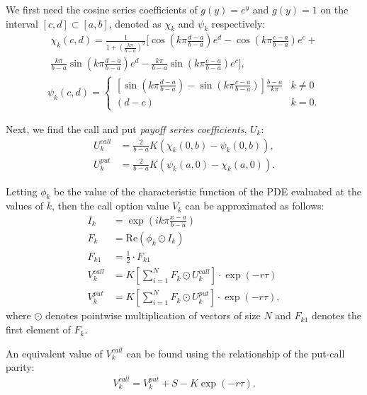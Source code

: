 \documentclass[12pt,a4paper]{article}
\begin{document}
We first need the cosine series coefficients of $g(y)=e^y$ and $g(y)=1$ on the interval $[c, d] \subset [a, b]$, denoted as $\chi_k$ and $\psi_k$ respectively:
\begin{align}
    \nonumber
    \chi_k(c, d) = \frac{1}{1+\left(\frac{k\pi}{b-a}\right)^2} \Biggl[ \cos\left(k\pi\frac{d-a}{b-a}\right)e^d - \cos\left(k\pi\frac{c-a}{b-a}\right)e^c + 
\\
\frac{k\pi}{b-a}\sin\left(k\pi\frac{d-a}{b-a}\right)e^d -  \frac{k\pi}{b-a}\sin\left(k\pi\frac{c-a}{b-a}\right)e^c \Biggr],
\end{align}
\begin{align}
\psi_k(c, d) = \begin{cases}
      \left[\sin\left(k\pi\frac{d-a}{b-a}\right) - \sin\left(k\pi\frac{c-a}{b-a}\right)\right]\frac{b-a}{k\pi} & k \neq 0\\
      (d-c) & k=0.
    \end{cases} 
\end{align}

Next, we find the call and put \textit{payoff series coefficients}, $U_k$:
\begin{align}
    U_k^{call} &= \frac{2}{b-a}K(\chi_k(0,b)-\psi_k(0,b)),\\
    U_k^{put} &= \frac{2}{b-a}K(\psi_k(a,0)-\chi_k(a,0)).
\end{align}

Letting $\phi_k$ be the value of the characteristic function of the PDE evaluated at the values of $k$, then the call option value $V_k$ can be approximated as follows:
\begin{align}
    \nonumber
    I_k &= \exp\left(ik\pi \frac{x-a}{b-a}\right)\\
    \nonumber
    F_k &= \text{Re}\left( \phi_k \odot I_k \right)\\
    \nonumber
    F_{k1} &= \frac{1}{2} \cdot F_{k1}\\
    V_k^{call} &= K \left[\sum_{i=1}^{N} F_k \odot U_k^{call}\right] \cdot \exp(-r\tau)\\
    V_k^{put} &= K \left[\sum_{i=1}^{N} F_k \odot U_k^{put}\right] \cdot \exp(-r\tau),
\end{align}
where $\odot$ denotes pointwise multiplication of vectors of size $N$ and $F_{k1}$ denotes the first element of $F_k$.

An equivalent value of $V_k^{call}$ can be found using the relationship of the put-call parity:
\begin{align}
    V_k^{call} = V_k^{put} + S - K\exp(-r\tau).
\end{align}
\end{document}
